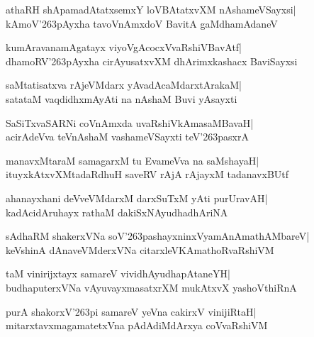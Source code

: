 \documentclass[twoside,12pt,openright]{book}
\def\S{\char'263}
\newcounter{shloka}[chapter]
\begin{document}
\begin{shloka}%
athaRH shApamadAtatxsemxY loVBAtatxvXM nAshameVSayxsi|\\
kAmoV\S pAyxha tavoVnAmxdoV BavitA gaMdhamAdaneV
\end{shloka}

\begin{shloka}%
kumAravanamAgatayx viyoVgAcocxVvaRshiVBavAtf|\\
dhamoRV\S pAyxha cirAyusatxvXM dhArimxkashacx BaviSayxsi
\end{shloka}

\begin{shloka}%
saMtatisatxva rAjeVMdarx yAvadAcaMdarxtArakaM|\\
satataM vaqdidhxmAyAti na nAshaM Buvi yAsayxti
\end{shloka}

\begin{shloka}%
SaSiTxvaSARNi coVnAmxda uvaRshiVkAmasaMBavaH|\\
acirAdeVva teVnAshaM vashameVSayxti teV\S pasxrA
\end{shloka}

\begin{shloka}%
manavxMtaraM samagarxM tu EvameVva na saMshayaH|\\
ituyxkAtxvXMtadaRdhuH saveRV rAjA rAjayxM tadanavxBUtf
\end{shloka}

\begin{shloka}%
ahanayxhani deVveVMdarxM darxSuTxM yAti purUravAH|\\
kadAcidAruhayx rathaM dakiSxNAyudhadhAriNA
\end{shloka}

\begin{shloka}%
sAdhaRM shakerxVNa soV\S pashayxninxVyamAnAmathAMbareV|\\
keVshinA dAnaveVMderxVNa citarxleVKAmathoRvaRshiVM
\end{shloka}

\begin{shloka}%
taM vinirijxtayx samareV vividhAyudhapAtaneYH|\\
budhaputerxVNa vAyuvayxmasatxrXM mukAtxvX yashoVthiRnA
\end{shloka}

\begin{shloka}%
purA shakorxV\S pi samareV yeVna cakirxV vinijiRtaH|\\
mitarxtavxmagamatetxVna pAdAdiMdArxya coVvaRshiVM 
\end{shloka}
\end{document}
